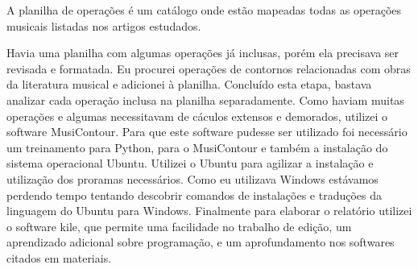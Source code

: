\documentclass[11pt]{article}
\begin{document}
A planilha de operações é um catálogo onde estão mapeadas todas as
operações musicais listadas nos artigos estudados.

Havia uma planilha com algumas operações já inclusas, porém ela
precisava ser revisada e formatada.
Eu procurei operações de contornos relacionadas com obras da literatura
musical e adicionei à planilha.
Concluído esta etapa, bastava analizar cada operação inclusa na
planilha separadamente. Como haviam muitas operações e algumas
necessitavam de cáculos extensos e demorados, utilizei o software
MusiContour. Para que este software pudesse ser utilizado foi
necessário um treinamento para Python, para o MusiContour e também a
instalação do sistema operacional Ubuntu.
Utilizei o Ubuntu para agilizar a instalação e utilização dos proramas
necessários. Como eu utilizava Windows estávamos perdendo tempo
tentando descobrir comandos de instalações e traduções da linguagem do
Ubuntu para Windows.
Finalmente para elaborar o relatório utilizei o software kile, que
permite uma facilidade no trabalho de edição, um aprendizado adicional
sobre programação, e um aprofundamento nos softwares citados em
materiais.

\label{sec:resultados}


\end{document}
